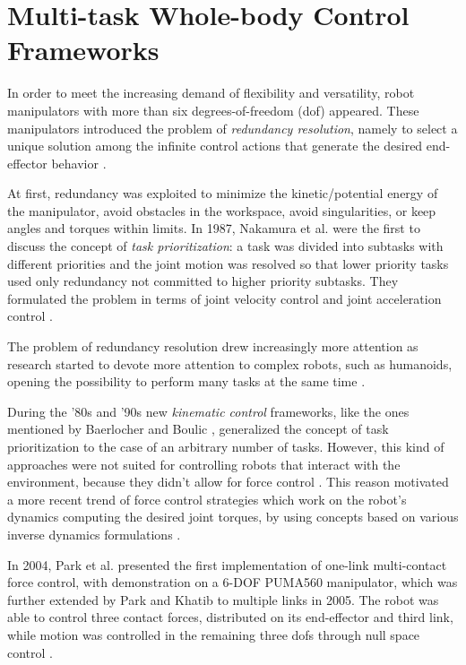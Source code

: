 \section{Multi-task Whole-body Control Frameworks}
	\label{sec:whole_body}
	
	In order to meet the increasing demand of flexibility and versatility, robot manipulators
	with more than six degrees-of-freedom (dof) appeared.
	These manipulators introduced the problem of \emph{redundancy resolution}, namely to select
	a unique solution among the infinite control actions that generate the desired end-effector
	behavior \cite{DelPrete_PhDThesis2013}.
	
	At first, redundancy was exploited to minimize the kinetic/potential energy of the manipulator,
	avoid obstacles in the workspace, avoid singularities, or keep angles and torques within limits.
	In 1987, Nakamura et al. \cite{Nakamura_IJRR1987} were the first to discuss the concept of
	\emph{task prioritization}: a task was divided into subtasks with different priorities and the
	joint motion was resolved so that lower priority tasks used only redundancy not committed to
	higher priority subtasks.
	They formulated the problem in terms of joint velocity control and joint acceleration control
	\cite{DelPrete_PhDThesis2013}.
	
	The problem of redundancy resolution drew increasingly more attention as research started to
	devote more attention to complex robots, such as humanoids, opening the possibility to perform
	many tasks at the same time \cite{DelPrete_PhDThesis2013}.
	
	During the '80s and '90s new \emph{kinematic control} frameworks, like the ones mentioned by
	Baerlocher and Boulic	\cite{Baerlocher_IROS1998}, generalized the concept of task prioritization
	to the case of an	arbitrary number of tasks.
	However, this kind of approaches were not suited for controlling robots that interact with the
	environment, because they didn't allow for force control \cite{DelPrete_PhDThesis2013}.
	This reason motivated a more recent trend of force control strategies which work on the robot's
	dynamics computing the desired joint torques, by using concepts based on various inverse dynamics
	formulations \cite{Khatib_IJHR2004} \cite{Moro_IJHR2016}.
	
	In 2004, Park et al. \cite{Park_ICRA2004} presented the first implementation of one-link multi-contact
	force control, with demonstration on a 6-DOF PUMA560 manipulator, which was further extended by
	Park and Khatib \cite{Park_ICRA2005} to multiple links in 2005. 
	The robot was able to control three contact forces, distributed on its end-effector and third
	link, while motion was controlled in the remaining three dofs through null space control
	\cite{DelPrete_PhDThesis2013}.
	
